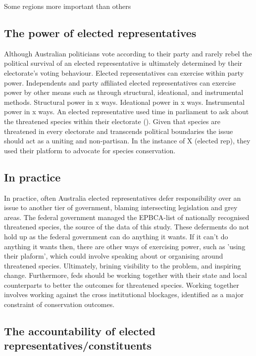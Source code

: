 \documentclass[a4paper,11pt]{article}
\begin{document}
Some regions more important than others




\subsection{The power of elected representatives}

Although Australian politicians vote according to their party and rarely rebel the political survival of an elected representative is ultimately determined by their electorate's voting behaviour. Elected representatives can exercise within party power. Independents and party affiliated elected representatives can exercise power by other means such as through structural, ideational, and instrumental methods.
Structural power in x ways.
Ideational power in x ways.
Instrumental power in x ways.
An elected representative used time in parliament to ask about the threatened species within their electorate (\cite{househansardQUESTIONSWRITINGMayo2019}).
Given that species are threatened in every electorate and transcends political boundaries the issue should act as a uniting and non-partisan.
In the instance of X (elected rep), they used their platform to advocate for species conservation.

\subsection{In practice}

In practice, often Australia elected representatives defer responsibility over an issue to another tier of government, blaming intersecting legislation and grey areas. The federal government managed the EPBCA-list of nationally recognised threatened species, the source of the data of this study. These deferments do not hold up as the federal government can do anything it wants. If it can't do anything it wants then, there are other ways of exercising power, such as 'using their plaform', which could involve speaking about or organising around threatened species. Ultimately, brining visibility to the problem, and inspiring change.
Furthermore, feds should be working together with their state and local counterparts to better the outcomes for threatened species. Working together involves working against the cross institutional blockages, identified as a major constraint of conservation outcomes.

\subsection{The accountability of elected representatives/constituents}
\end{document}
